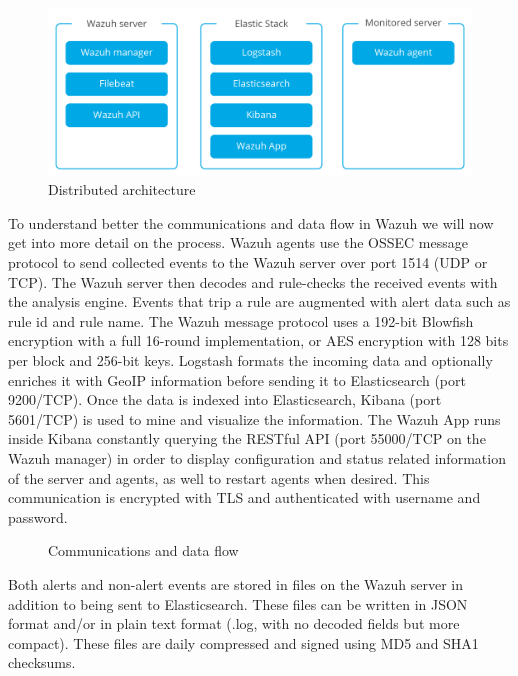 \begin{figure}[H]
  \centering
	\includegraphics[width=\textwidth]{figuras/wazuh_distributed.png}
	\caption{Distributed architecture}
\end{figure}
\linej
To understand better the communications and data flow in Wazuh we will now get into more detail on the process\cite{wazuh_architecture2}\cite{wazuh_data_flow}.
\linej
\linej
Wazuh agents use the OSSEC message protocol to send collected events to the Wazuh server over port 1514 (UDP or TCP). The Wazuh server then decodes and rule-checks the received events with the analysis engine. Events that trip a rule are augmented with alert data such as rule id and rule name. The Wazuh message protocol uses a 192-bit Blowfish encryption with a full 16-round implementation, or AES encryption with 128 bits per block and 256-bit keys.
\linej
Logstash formats the incoming data and optionally enriches it with GeoIP information before sending it to Elasticsearch (port 9200/TCP). Once the data is indexed into Elasticsearch, Kibana (port 5601/TCP) is used to mine and visualize the information.
\linej
The Wazuh App runs inside Kibana constantly querying the RESTful API (port 55000/TCP on the Wazuh manager) in order to display configuration and status related information of the server and agents, as well to restart agents when desired. This communication is encrypted with TLS and authenticated with username and password.

\begin{figure}[H]
  \centering
	\caption{Communications and data flow}
\end{figure}
\linej
Both alerts and non-alert events are stored in files on the Wazuh server in addition to being sent to Elasticsearch. These files can be written in JSON format and/or in plain text format (.log, with no decoded fields but more compact). These files are daily compressed and signed using MD5 and SHA1 checksums.


